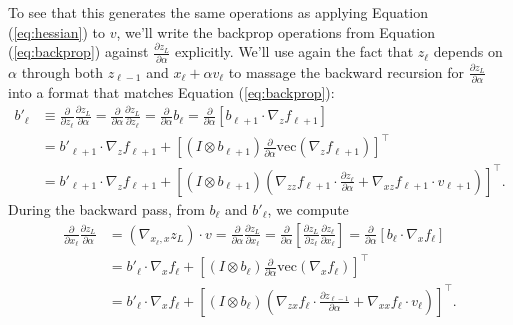 \documentclass{article}
\begin{document}
To see that this generates the same operations as applying Equation (\ref{eq:hessian}) to $v$, we'll write the backprop
operations from Equation (\ref{eq:backprop}) against $\frac{\partial z_L}{\partial \alpha}$ explicitly. We'll use again
the fact that $z_\ell$ depends on $\alpha$ through both $z_{\ell-1}$ and $x_\ell + \alpha v_\ell$ to massage the
backward recursion for $\frac{\partial z_L}{\partial \alpha}$ into a format that matches Equation
(\ref{eq:backprop}):
\begin{align}
  b'_\ell & \equiv \frac{\partial}{\partial z_\ell} \frac{\partial z_L}{\partial \alpha}
  = \frac{\partial}{\partial \alpha} \frac{\partial z_L}{\partial z_\ell}
  = \frac{\partial}{\partial \alpha} b_\ell
  = \frac{\partial}{\partial \alpha} \left[b_{\ell+1} \cdot \nabla_z f_{\ell+1}\right]                                                                                                                                                 \\
          & = b'_{\ell+1} \cdot \nabla_z f_{\ell+1} + \left[\left(I \otimes b_{\ell+1}\right) \frac{\partial}{\partial \alpha} \text{vec}\left(\nabla_z f_{\ell+1}\right) \right]^\top                                                 \\
          & = b'_{\ell+1} \cdot \nabla_z f_{\ell+1} + \left[\left(I \otimes b_{\ell+1}\right) \left(\nabla_{zz} f_{\ell+1} \cdot \frac{\partial z_\ell}{\partial \alpha} + \nabla_{xz} f_{\ell+1} \cdot v_{\ell+1}\right)\right]^\top.
\end{align}
During the backward pass, from $b_\ell$ and $b'_\ell$, we compute
\begin{align}
  \frac{\partial }{\partial x_\ell} \frac{\partial z_L}{\partial \alpha}
   & =\left(\nabla_{x_\ell, x} z_L\right) \cdot v
  = \frac{\partial}{\partial \alpha} \frac{\partial z_L}{\partial x_\ell}
  = \frac{\partial}{\partial \alpha} \left[\frac{\partial z_L}{\partial z_{\ell}} \frac{\partial z_\ell}{\partial x_\ell}\right]
  = \frac{\partial}{\partial \alpha} \left[b_\ell \cdot \nabla_x f_\ell\right]                                                                                                                             \\
   & = b'_\ell \cdot \nabla_x f_\ell + \left[\left(I\otimes b_\ell\right) \frac{\partial}{\partial \alpha} \text{vec}\left(\nabla_x f_\ell\right)\right]^\top                                              \\
   & = b'_\ell \cdot \nabla_x f_\ell + \left[\left(I\otimes b_\ell\right) \left(\nabla_{zx} f_\ell \cdot \frac{\partial z_{\ell-1}}{\partial \alpha} + \nabla_{xx} f_\ell \cdot v_\ell\right)\right]^\top.
\end{align}
\end{document}
